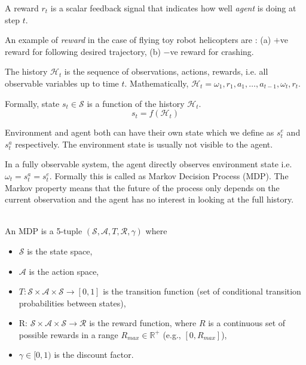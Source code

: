 A reward $r_t$ is a scalar feedback signal that indicates how well {\em agent} is doing at step $t$.

An example of  {\em reward} in the case of flying toy robot helicopters are : (a) $+$ve reward for following desired trajectory, (b) $−$ve reward for crashing.

 The history $\mathcal{H}_t$ is the sequence of observations, actions, rewards, i.e. all observable variables up to time $t$. Mathematically, $\mathcal{H}_t = \omega_1,r_1,a_1,\ldots,a_{t-1},\omega_t,r_t$.

Formally, state $s_t \in \mathcal{S}$ is a function of the history $\mathcal{H}_t$.
$$s_t = f(\mathcal{H}_t)$$

Environment and agent both can have their own state which we define as $s_t^e$ and $s_t^a$ respectively. The environment state is usually not visible to the agent.

In a fully observable system, the agent directly observes environment state i.e. $\omega_t = s^a_t = s_t^e$. Formally this is called as Markov Decision Process (MDP). The Markov property means that the future of the process only
depends on the current observation and the agent has no interest in
looking at the full history.

\\  An MDP is a 5-tuple $(\mathcal{S}, \mathcal{A}, T, \mathcal{R}, \gamma)$ where
\begin{itemize}
  \item[] $\mathcal{S}$ is the state space,
  \item[] $\mathcal{A}$ is the action space,
  \item[] $T : \mathcal{S} \times \mathcal{A}\times \mathcal{S} \rightarrow [0, 1]$ is the transition function (set of conditional
  transition probabilities between states),
  \item[] R: $\mathcal{S} \times \mathcal{A}\times \mathcal{S} \rightarrow \mathcal{R}$ is the reward function, where $R$ is a continuous set of possible rewards in a range $R_{max} \in \mathbb{R}^+$ (e.g., $[0, R_{max}]$),
  \item[] $\gamma \in  [0, 1)$ is the discount factor.
\end{itemize}


